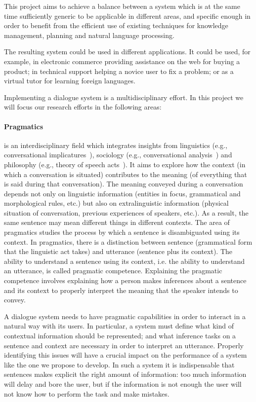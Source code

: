 This project aims to achieve a balance between a system which is at the 
same time sufficiently generic to be applicable in different areas, and 
specific enough in order to benefit from the efficient use of existing 
techniques for knowledge management, planning and natural language processing.

The resulting system could be used in different applications. It could be used, 
for example, in electronic commerce providing 
assistance on the web for buying a product; in technical support helping a
novice user to fix a problem; or as a virtual tutor for learning foreign 
languages. 

Implementing a dialogue system is a multidisciplinary effort. In this project
we will focus our research efforts in the following areas:

\paragraph{Pragmatics} is an interdisciplinary field which
integrates insights from linguistics (e.g., 
conversational implicatures~\cite{grice75}),
sociology (e.g., conversational analysis~\cite{schegloff87b}) and
philosophy (e.g., theory of speech acts~\cite{austin62}). It aims to explore how
the context (in which a conversation is situated) contributes to the meaning (of
everything that is said during that conversation). The meaning conveyed during
a conversation depends not only on linguistic information (entities in focus,
grammatical and morphological rules, etc.) but also on extralinguistic
information (physical situation of conversation, previous
experiences of speakers, etc.). As a result, the same sentence may mean
different things in different contexts. The area of pragmatics studies the
process by which a sentence is disambiguated using its context. In pragmatics,
there is a distinction between sentence (grammatical form that
the linguistic act takes) and utterance (sentence plus its context). The ability
to understand a sentence using its context, i.e. the ability to understand an
utterance, is called pragmatic competence. Explaining the pragmatic competence
involves explaining how a person makes inferences about a sentence and its
context to properly interpret the meaning that the speaker intends to convey.

A dialogue system needs to have pragmatic capabilities in order to interact in a
natural way with its users. In particular, a system must define what kind of
contextual information should be represented; and what inference tasks on a
sentence and context are necessary in order to interpret an utterance. Properly 
identifying this issues will have a crucial impact on the performance of a system
like the one we propose to develop. In such a system it is indispensable that
sentences makes explicit the right amount of information: too much information
will delay and bore the user, but if the information is not enough the user 
will not know how to perform the task and make mistakes.

